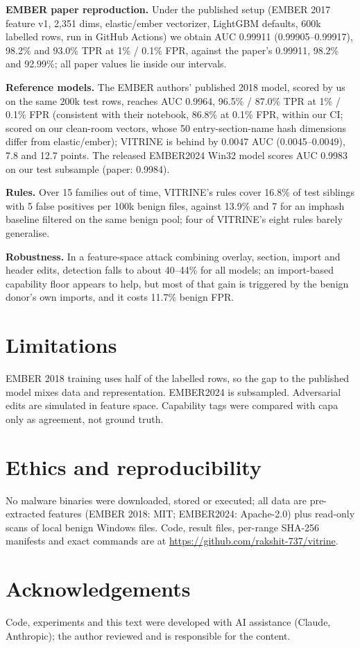 \documentclass[10pt]{article}
\begin{document}
\textbf{EMBER paper reproduction.} Under the published setup (EMBER 2017 feature v1, 2{,}351 dims,
elastic/ember vectorizer, LightGBM defaults, 600k labelled rows, run in GitHub Actions) we obtain AUC
0.99911 (0.99905--0.99917), 98.2\% and 93.0\% TPR at 1\% / 0.1\% FPR, against the paper's 0.99911,
98.2\% and 92.99\%; all paper values lie inside our intervals.

\textbf{Reference models.} The EMBER authors' published 2018 model, scored by us on the same 200k test
rows, reaches AUC 0.9964, 96.5\% / 87.0\% TPR at 1\% / 0.1\% FPR (consistent with their notebook, 86.8\% at 0.1\% FPR, within our CI; scored on our clean-room vectors, whose 50 entry-section-name hash dimensions differ from elastic/ember); VITRINE
is behind by 0.0047 AUC (0.0045--0.0049), 7.8 and 12.7 points. The released EMBER2024 Win32 model scores
AUC 0.9983 on our test subsample (paper: 0.9984).

\textbf{Rules.} Over 15 families out of time, VITRINE's rules cover 16.8\% of test siblings with 5
false positives per 100k benign files, against 13.9\% and 7 for an imphash baseline filtered on the
same benign pool; four of VITRINE's eight rules barely generalise.

\textbf{Robustness.} In a feature-space attack combining overlay, section, import and header edits,
detection falls to about 40--44\% for all models; an import-based capability floor appears to help,
but most of that gain is triggered by the benign donor's own imports, and it costs 11.7\% benign FPR.

\section{Limitations}
EMBER 2018 training uses half of the labelled rows, so the gap to the published model mixes data and
representation. EMBER2024 is subsampled. 
Adversarial edits are simulated in feature space. Capability tags were compared with capa only as
agreement, not ground truth.

\section{Ethics and reproducibility}
No malware binaries were downloaded, stored or executed; all data are pre-extracted features
(EMBER 2018: MIT; EMBER2024: Apache-2.0) plus read-only scans of local benign Windows files. Code,
result files, per-range SHA-256 manifests and exact commands are at
\url{https://github.com/rakshit-737/vitrine}.

\section*{Acknowledgements}
Code, experiments and this text were developed with AI assistance (Claude, Anthropic); the author
reviewed and is responsible for the content.



\end{document}
